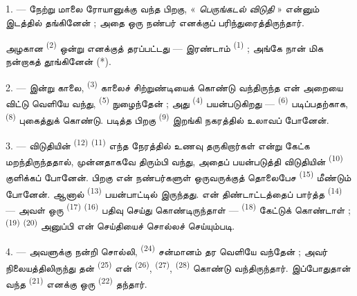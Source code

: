 
\VUsaut{3.0mm}
\VUsaut{1.6mm}
\VUsaut{2.0mm}
\VUsaut{3.4mm}

1. --- நேற்று மாலை ரோயானுக்கு வந்த பிறகு, « \textit{பெருங்கடல் விடுதி} »
என்னும் இடத்தில் தங்கினேன் ; அதை ஒரு நண்பர் எனக்குப் பரிந்துரைத்திருந்தார்.

அழகான  \textsuperscript{(2)} ஒன்று எனக்குத் தரப்பட்டது —
இரண்டாம்  \textsuperscript{(1)} ; அங்கே நான் மிக நன்றாகத்
தூங்கினேன் (*).

2. --- இன்று காலை,  \textsuperscript{(3)} காலைச்
சிற்றுண்டியைக் கொண்டு வந்திருந்த என் அறையை விட்டு வெளியே வந்து,
 \textsuperscript{(5)} நுழைந்தேன் ; அது
 \textsuperscript{(4)} பயன்படுகிறது —
 \textsuperscript{(6)} படிப்பதற்காக,
 \textsuperscript{(8)} புகைத்துக் கொண்டு. படித்த
பிறகு  \textsuperscript{(9)} இறங்கி நகரத்தில்
உலாவப் போனேன்.

3. --- விடுதியின்  \textsuperscript{(12)}
 \textsuperscript{(11)} எந்த நேரத்தில் உணவு
தருகிறார்கள் என்று கேட்க மறந்திருந்ததால், முன்னதாகவே திரும்பி வந்து, அதைப் பயன்படுத்தி
விடுதியின்  \textsuperscript{(10)} குளிக்கப்
போனேன். பிறகு என் நண்பர்களுள் ஒருவருக்குத் தொலைபேச  \textsuperscript{(15)} மீண்டும் போனேன். ஆனால் 
\textsuperscript{(13)} பயன்பாட்டில் இருந்தது. என் திண்டாட்டத்தைப் பார்த்த
 \textsuperscript{(14)} — அவள் ஒரு  \textsuperscript{(17)} 
\textsuperscript{(16)} பதிவு செய்து கொண்டிருந்தாள் —
 \textsuperscript{(18)} கேட்டுக் கொண்டாள் ;
 \textsuperscript{(19)} 
\textsuperscript{(20)} அனுப்பி என் செய்தியைச் சொல்லச் செய்யும்படி.

4. --- அவளுக்கு நன்றி சொல்லி, 
\textsuperscript{(24)} சன்மானம் தர வெளியே வந்தேன் ; அவர் நிலையத்திலிருந்து
தன்  \textsuperscript{(25)} என்  \textsuperscript{(26)}, 
\textsuperscript{(27)}, 
\textsuperscript{(28)} கொண்டு வந்திருந்தார். இப்போதுதான் வந்த
 \textsuperscript{(21)} எனக்கு ஒரு
 \textsuperscript{(22)} தந்தார்.

